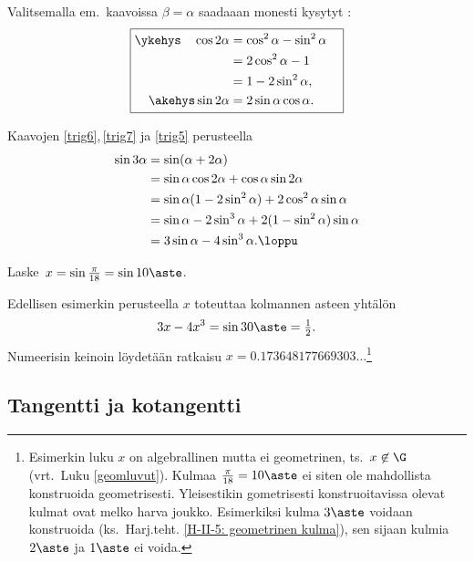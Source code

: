 Valitsemalla em.\ kaavoissa $\beta = \alpha$ saadaaan monesti kysytyt
:
\begin{equation} \label{trig7} \boxed{ \begin{aligned}
\ykehys\quad \cos 2\alpha &= \cos^2\alpha-\sin^2\alpha \quad \\ 
                          &= 2\cos^2 \alpha - 1 \\
                          &= 1-2\sin^2\alpha, \quad \\
     \akehys \sin 2\alpha &= 2\sin \alpha \cos \alpha.
\end{aligned} } \end{equation}
\begin{Exa} \label{sin kolme alpha} Kaavojen \eqref{trig6},\,\eqref{trig7} ja \eqref{trig5}
perusteella
\begin{align*}
\sin 3\alpha &= \sin (\alpha + 2\alpha) \\
&= \sin \alpha \cos 2\alpha + \cos \alpha \sin 2\alpha \\
&= \sin \alpha(1-2\sin^2 \alpha) + 2\cos^2 \alpha \sin \alpha \\
&= \sin \alpha - 2\sin^3 \alpha + 2(1-\sin^2 \alpha) \sin \alpha \\
&= 3\sin\alpha - 4\sin^3\alpha. \loppu
\end{align*}
\end{Exa}
\begin{Exa} \label{kulman kolmijako}
Laske $\,x = \sin\frac{\pi}{18} = \sin 10\aste$.
\end{Exa}
\ratk Edellisen esimerkin perusteella $x$ toteuttaa kolmannen asteen yhtälön
\[
3x - 4x^3 = \sin 30\aste = \tfrac{1}{2}.
\]
Numeerisin keinoin löydetään ratkaisu $x=0.173648177669303 \ldots$\footnote[2]{Esimerkin luku
$x$ on algebrallinen mutta ei geometrinen, ts.\ $x \not\in\G$ (vrt.\ Luku \ref{geomluvut}). 
Kulmaa $\frac{\pi}{18} = 10\aste$ ei siten ole mahdollista konstruoida geometrisesti.
Yleisestikin gometrisesti konstruoitavissa olevat kulmat ovat melko harva joukko. Esimerkiksi
kulma $3\aste$ voidaan konstruoida (ks.\ Harj.teht. \ref{H-II-5: geometrinen kulma}), sen
sijaan kulmia $2\aste$ ja $1\aste$ ei voida.} \loppu

\subsection*{Tangentti ja kotangentti}

